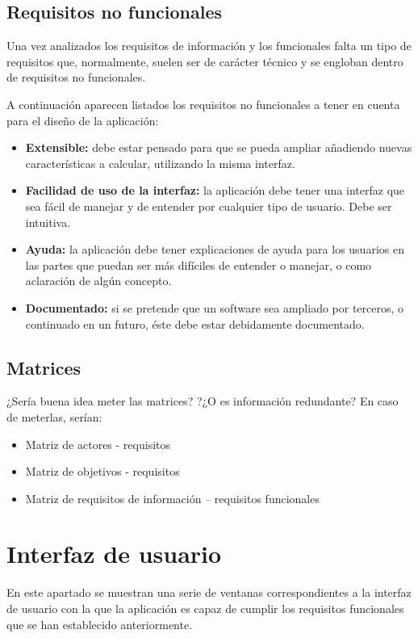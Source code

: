 \newpage
\subsection{Requisitos no funcionales}
Una vez analizados los requisitos de información y los funcionales falta un tipo de requisitos que, normalmente, suelen ser de carácter técnico y se engloban dentro de requisitos no funcionales.

A continuación aparecen listados los requisitos no funcionales a tener en cuenta para el diseño de la aplicación:

\begin{itemize}
 \item \textbf{Extensible:} debe estar pensado para que se pueda ampliar añadiendo nuevas características a calcular, utilizando la misma interfaz.
 \item \textbf{Facilidad de uso de la interfaz:} la aplicación debe tener una interfaz que sea fácil de manejar y de entender por cualquier tipo de usuario. Debe ser intuitiva.
 \item \textbf{Ayuda:} la aplicación debe tener explicaciones de ayuda para los usuarios en las partes que puedan ser más difíciles de entender o manejar, o como aclaración de algún concepto.
 \item \textbf{Documentado:} si se pretende que un software sea ampliado por terceros, o continuado en un futuro, éste debe estar debidamente documentado.
\end{itemize}
\newpage

\subsection{Matrices}
¿Sería buena idea meter las matrices? ?¿O es información redundante? En caso de meterlas, serían:

\begin{itemize}
\item Matriz de actores - requisitos
\item Matriz de objetivos - requisitos
\item Matriz de requisitos de información – requisitos funcionales
\end{itemize}

\section{Interfaz de usuario}
En este apartado se muestran una serie de ventanas correspondientes a la interfaz de usuario con la que la aplicación es capaz de cumplir los requisitos funcionales que se han establecido anteriormente.

